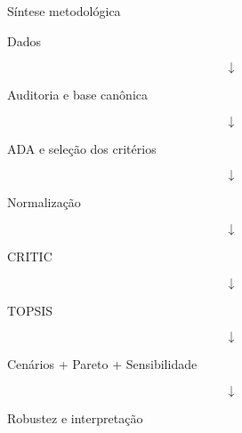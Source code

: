 
\begin{frame}{Síntese metodológica}

    \begin{center}

        Dados

        \[
        \downarrow
        \]

        Auditoria e base canônica

        \[
        \downarrow
        \]

        ADA e seleção dos critérios

        \[
        \downarrow
        \]

        Normalização

        \[
        \downarrow
        \]

        CRITIC

        \[
        \downarrow
        \]

        TOPSIS

        \[
        \downarrow
        \]

        Cenários + Pareto + Sensibilidade

        \[
        \downarrow
        \]

        Robustez e interpretação

    \end{center}

\end{frame}


%
%


%
%
%
%
%


